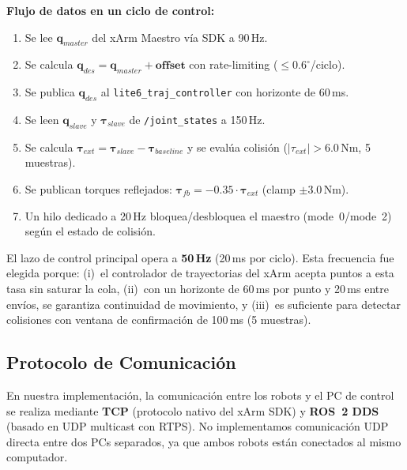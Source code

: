 \documentclass[journal,10pt,twoside]{IEEEtran}
\begin{document}
\textbf{Flujo de datos en un ciclo de control:}
\begin{enumerate}
  \item Se lee $\bm{q}_{master}$ del xArm Maestro vía SDK a 90\,Hz.
  \item Se calcula $\bm{q}_{des}=\bm{q}_{master}+\bm{offset}$ con
        rate-limiting ($\leq 0{.}6^\circ$/ciclo).
  \item Se publica $\bm{q}_{des}$ al \texttt{lite6\_traj\_controller}
        con horizonte de 60\,ms.
  \item Se leen $\bm{q}_{slave}$ y $\bm{\tau}_{slave}$ de \texttt{/joint\_states}
        a 150\,Hz.
  \item Se calcula $\bm{\tau}_{ext}=\bm{\tau}_{slave}-\bm{\tau}_{baseline}$
        y se evalúa colisión ($|\tau_{ext}|>6{.}0$\,Nm, 5 muestras).
  \item Se publican torques reflejados:
        $\bm{\tau}_{fb}=-0{.}35\cdot\bm{\tau}_{ext}$ (clamp $\pm3{.}0$\,Nm).
  \item Un hilo dedicado a 20\,Hz bloquea/desbloquea el maestro
        (mode~0/mode~2) según el estado de colisión.
\end{enumerate}

El lazo de control principal opera a \textbf{50\,Hz} (20\,ms
por ciclo). Esta frecuencia fue elegida porque: (i)~el controlador de
trayectorias del xArm acepta puntos a esta tasa sin saturar la cola,
(ii)~con un horizonte de 60\,ms por punto y 20\,ms entre envíos, se
garantiza continuidad de movimiento, y (iii)~es suficiente para detectar
colisiones con ventana de confirmación de 100\,ms (5 muestras).

\subsection{Protocolo de Comunicación}
En nuestra implementación, la comunicación entre los robots
y el PC de control se realiza mediante \textbf{TCP} (protocolo nativo
del xArm SDK) y \textbf{ROS~2 DDS} (basado en UDP multicast con RTPS).
No implementamos comunicación UDP directa entre dos PCs separados, ya
que ambos robots están conectados al mismo computador.

\smallskip
{}
\smallskip
\end{document}
